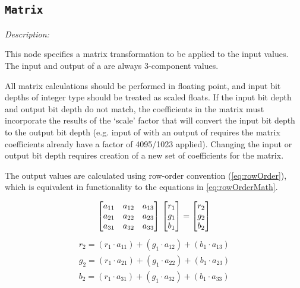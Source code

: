 \subsection{\texttt{Matrix}}

\emph{Description:} \par
This node specifies a matrix transformation to be applied to the input values. The input and output of a  are always 3-component values. 

All matrix calculations should be performed in floating point, and input bit depths of integer type should be treated as scaled floats. If the input bit depth and output bit depth do not match, the coefficients in the matrix must incorporate the results of the `scale' factor that will convert the input bit depth to the output bit depth (e.g. input of  with an output of  requires the matrix coefficients already have a factor of 4095/1023 applied). Changing the input or output bit depth requires creation of a new set of coefficients for the matrix.

The output values are calculated using row-order convention (\autoref{eq:rowOrder}), which is equivalent in functionality to the equations in \ref{eq:rowOrderMath}.

\begin{equation} \label{eq:rowOrder}
    \begin{bmatrix*}
        a_{11} & a_{12} & a_{13} \\
        a_{21} & a_{22} & a_{23} \\
        a_{31} & a_{32} & a_{33} \\
    \end{bmatrix*} \\
    \begin{bmatrix}
        r_1\\
        g_1\\
        b_1
    \end{bmatrix}
    =
    \begin{bmatrix}
        r_2\\
        g_2\\
        b_2
    \end{bmatrix}
\end{equation}
\begin{equation} \label{eq:rowOrderMath}
    \begin{aligned}
        r_2 = (r_1 \cdot a_{11}) + (g_1 \cdot a_{12}) + (b_1 \cdot a_{13}) \\
	    g_2 = (r_1 \cdot a_{21}) + (g_1 \cdot a_{22}) + (b_1 \cdot a_{23}) \\
	    b_2 = (r_1 \cdot a_{31}) + (g_1 \cdot a_{32}) + (b_1 \cdot a_{33})
    \end{aligned}    
\end{equation}

